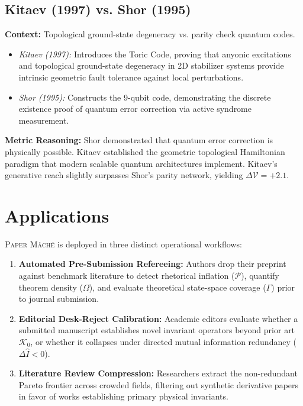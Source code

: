 \documentclass[twocolumn,10pt,letterpaper]{article}
\begin{document}
\subsection{Kitaev (1997) vs. Shor (1995)}
\textbf{Context:} Topological ground-state degeneracy vs. parity check quantum codes.
\begin{itemize}
\item \textit{Kitaev (1997):} Introduces the Toric Code, proving that anyonic excitations and topological ground-state degeneracy in 2D stabilizer systems provide intrinsic geometric fault tolerance against local perturbations.
\item \textit{Shor (1995):} Constructs the 9-qubit code, demonstrating the discrete existence proof of quantum error correction via active syndrome measurement.
\end{itemize}
\textbf{Metric Reasoning:} Shor demonstrated that quantum error correction is physically possible. Kitaev established the geometric topological Hamiltonian paradigm that modern scalable quantum architectures implement. Kitaev's generative reach slightly surpasses Shor's parity network, yielding $\Delta \mathcal{V} = +2.1$.

\section{Applications}

\textsc{Paper M\^ach\'e} is deployed in three distinct operational workflows:
\begin{enumerate}
\item \textbf{Automated Pre-Submission Refereeing:} Authors drop their preprint against benchmark literature to detect rhetorical inflation ($\mathcal{P}$), quantify theorem density ($\Omega$), and evaluate theoretical state-space coverage ($\Gamma$) prior to journal submission.
\item \textbf{Editorial Desk-Reject Calibration:} Academic editors evaluate whether a submitted manuscript establishes novel invariant operators beyond prior art $\mathcal{K}_0$, or whether it collapses under directed mutual information redundancy ($\Delta \hat{I} < 0$).
\item \textbf{Literature Review Compression:} Researchers extract the non-redundant Pareto frontier across crowded fields, filtering out synthetic derivative papers in favor of works establishing primary physical invariants.
\end{enumerate}
\end{document}
